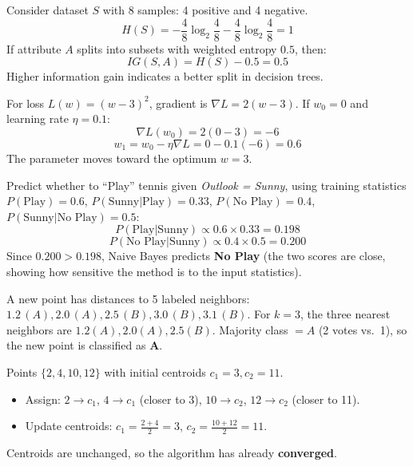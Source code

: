 \documentclass[11pt,a4paper]{article}
\begin{document}
\begin{examplebox}
Consider dataset $S$ with 8 samples: 4 positive and 4 negative.
$$
H(S)=-\frac{4}{8}\log_2\frac{4}{8}-\frac{4}{8}\log_2\frac{4}{8}=1
$$
If attribute $A$ splits into subsets with weighted entropy $0.5$, then:
$$
IG(S,A)=H(S)-0.5=0.5
$$
Higher information gain indicates a better split in decision trees.
\end{examplebox}

\begin{examplebox}
For loss $L(w)=(w-3)^2$, gradient is $\nabla L=2(w-3)$. If $w_0=0$ and learning rate $\eta=0.1$:
$$
\nabla L(w_0)=2(0-3)=-6
$$
$$
w_1=w_0-\eta\nabla L=0-0.1(-6)=0.6
$$
The parameter moves toward the optimum $w=3$.
\end{examplebox}

\begin{examplebox}
Predict whether to ``Play'' tennis given \textit{Outlook = Sunny}, using training statistics $P(\text{Play})=0.6$, $P(\text{Sunny}|\text{Play})=0.33$, $P(\text{No Play})=0.4$, $P(\text{Sunny}|\text{No Play})=0.5$:
$$
P(\text{Play}|\text{Sunny}) \propto 0.6 \times 0.33 = 0.198
$$
$$
P(\text{No Play}|\text{Sunny}) \propto 0.4 \times 0.5 = 0.200
$$
Since $0.200 > 0.198$, Naive Bayes predicts \textbf{No Play} (the two scores are close, showing how sensitive the method is to the input statistics).
\end{examplebox}

\begin{examplebox}
A new point has distances to 5 labeled neighbors: $1.2\,(A), 2.0\,(A), 2.5\,(B), 3.0\,(B), 3.1\,(B)$. For $k=3$, the three nearest neighbors are $1.2(A), 2.0(A), 2.5(B)$. Majority class $=A$ (2 votes vs.\ 1), so the new point is classified as \textbf{A}.
\end{examplebox}

\begin{examplebox}
Points $\{2,4,10,12\}$ with initial centroids $c_1=3, c_2=11$.
\begin{itemize}[leftmargin=*]
  \item Assign: $2\to c_1$, $4\to c_1$ (closer to 3), $10\to c_2$, $12\to c_2$ (closer to 11).
  \item Update centroids: $c_1=\frac{2+4}{2}=3$, $c_2=\frac{10+12}{2}=11$.
\end{itemize}
Centroids are unchanged, so the algorithm has already \textbf{converged}.
\end{examplebox}
\end{document}
